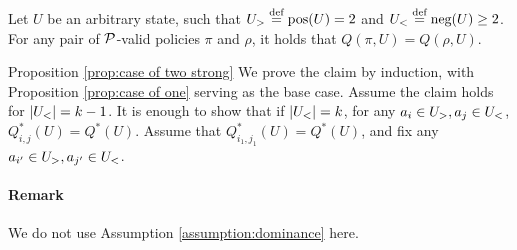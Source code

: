 \begin{proposition}\label{prop:case of two strong}
Let $U$ be an arbitrary state, such that $U_>\stackrel{\text{def}}{=}\textnormal{pos}(U)=2$ and $U_<\stackrel{\text{def}}{=}\textnormal{neg}(U) \geq 2$. For any pair of $\mathcal{P}$-valid policies $\pi$ and $\rho$, it holds that $Q(\pi,U)=Q(\rho,U)$.
\end{proposition}
\begin{proofof}{Proposition \ref{prop:case of two strong}}
We prove the claim by induction, with Proposition \ref{prop:case of one} serving as the base case. Assume the claim holds for $\left| U_< \right|=k-1$. It is enough to show that if $\left| U_< \right|=k$, for any $a_i\in U_>,a_j\in U_<$, $Q^*_{i,j}(U)=Q^*(U)$. Assume that $Q^*_{{i_1},{j_1}}(U)=Q^*(U)$, and fix any $a_{i'}\in U_>, a_{j'}\in U_<$. 
\paragraph{Remark} We do not use Assumption \ref{assumption:dominance} here.

\end{proofof}
